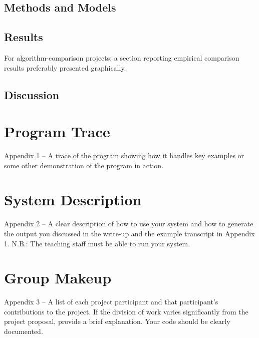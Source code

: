 \documentclass[11pt]{article}
\begin{document}
\subsection{Methods and Models}


\subsection{Results}

 For algorithm-comparison projects: a section reporting empirical comparison results preferably presented graphically.


\subsection{Discussion}


\appendix

\section{Program Trace}

Appendix 1 – A trace of the program showing how it handles key examples or some other demonstration of the program in action.

\section{System Description}

 Appendix 2 – A clear description of how to use your system and how to generate the output you discussed in the write-up and the example transcript in Appendix 1. N.B.: The teaching staff must be able to run your system.

\section{Group Makeup}

 Appendix 3 – A list of each project participant and that
participant’s contributions to the project. If the division of work
varies significantly from the project proposal, provide a brief
explanation.  Your code should be clearly documented. 



 

\end{document}
